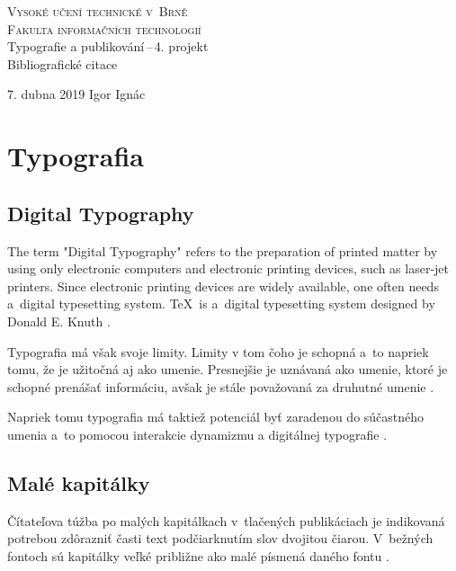 \documentclass[a4paper, titlepage, 11pt]{article}
\begin{document}
  \begin{titlepage}
    \begin{center}
      \Huge \textsc{Vysoké učení technické v~Brně}\\
      \huge \textsc{Fakulta informačních technologií}\\
      \LARGE Typografie a publikování\,--\,4. projekt\\
      \Huge Bibliografické citace
    \end{center}
    {\Large 7. dubna 2019 \hfill Igor Ignác}
  \end{titlepage}

\section{Typografia}
\subsection{Digital Typography}

  The term "Digital Typography" refers to the preparation of printed matter by using only
  electronic computers and electronic printing devices, such as laser-jet printers. Since
  electronic printing devices are widely available, one often needs a~digital typesetting
  system. \TeX\ is a~digital typesetting system designed by Donald E. Knuth
  \cite{book:29389}.\newline

  \noindent Typografia má však svoje limity. Limity v tom čoho je schopná a~to napriek tomu, že je užitočná aj ako umenie. Presnejšie je uznávaná ako umenie, ktoré je schopné prenášať informáciu, avšak je stále považovaná za druhutné umenie
  \cite{article:75643}.\newline

  \noindent Napriek tomu typografia má taktiež potenciál byť zaradenou do súčastného umenia a~to pomocou interakcie dynamizmu a digitálnej typografie
  \cite{article:59853}.


\subsection{Malé kapitálky}

  Čítateľova túžba po malých kapitálkach v~tlačených publikáciach je indikovaná potrebou zdôrazniť časti text podčiarknutím slov dvojitou čiarou. V~bežných fontoch sú kapitálky veľké približne ako malé písmená daného fontu
  \cite{book:110635}.
\end{document}
